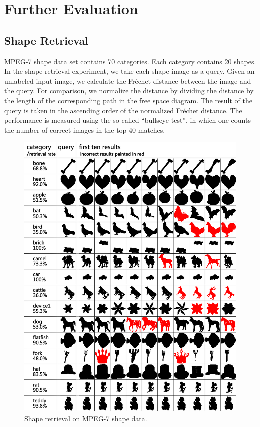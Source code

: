 \documentclass[10pt,letterpaper]{article}
\begin{document}
\section{Further Evaluation}

\subsection{Shape Retrieval}

MPEG-7 shape data set contains 70 categories.
Each category contains 20 shapes.
In the shape retrieval experiment, we take each shape image as a query.
Given an unlabeled input image, we calculate the Fr\'echet distance between the image and the query.
For comparison, we normalize the distance 
by dividing the distance by the length of the corresponding path in the free space diagram.
The result of the query is taken in the ascending order of the normalized Fr\'echet distance.
The performance is measured using the so-called ``bullseye test'', 
in which one counts the number of correct images in the top 40 matches.

\begin{figure}[ht]
\begin{center}
\includegraphics[width=1\linewidth]{images/fig10.png}
\end{center}
\caption{Shape retrieval on MPEG-7 shape data.} 
\label{fig:10}
\end{figure}
\end{document}
